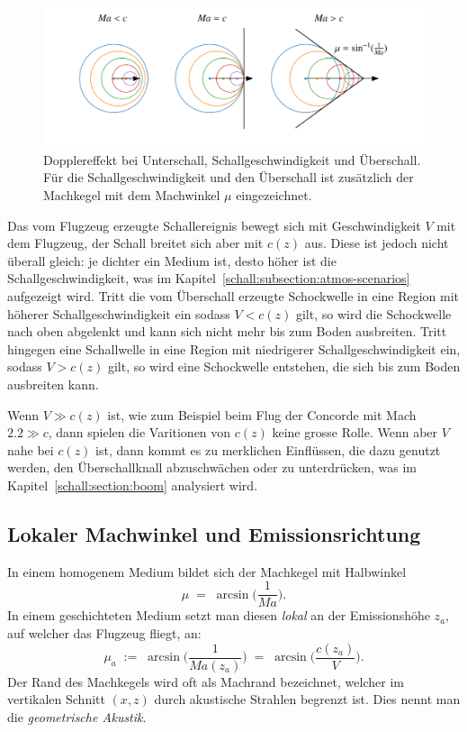 \begin{figure}
    \centering
    \includegraphics[width=\textwidth]{papers/schall/figures/mach_doppler_triptych_offsets.png}
    \caption{Dopplereffekt bei Unterschall, Schallgeschwindigkeit und Überschall.
    Für die Schallgeschwindigkeit und den Überschall ist zusätzlich der
    Machkegel mit dem Machwinkel $\mu$ eingezeichnet.}
    \label{fig:schall:mach-zones}
\end{figure}
Das vom Flugzeug erzeugte Schallereignis bewegt sich mit Geschwindigkeit $V$
mit dem Flugzeug, der Schall breitet sich aber mit $c(z)$ aus.
Diese ist jedoch nicht überall gleich: je dichter ein Medium ist, desto
höher ist die Schallgeschwindigkeit, was im
Kapitel~\ref{schall:subsection:atmos-scenarios} aufgezeigt wird.
Tritt die vom Überschall erzeugte Schockwelle in eine Region mit höherer
Schallgeschwindigkeit ein sodass $V<c(z)$ gilt, so wird die Schockwelle
nach oben abgelenkt und kann sich nicht mehr bis zum Boden ausbreiten.
Tritt hingegen eine Schallwelle in eine Region mit niedrigerer
Schallgeschwindigkeit ein, sodass $V>c(z)$ gilt, so wird eine Schockwelle
entstehen, die sich bis zum Boden ausbreiten kann.

Wenn $V \gg c(z)$ ist, wie zum Beispiel beim Flug der Concorde mit Mach
$2.2 \gg c$, dann spielen die Varitionen von $c(z)$ keine grosse Rolle.
Wenn aber $V$ nahe bei $c(z)$ ist, dann kommt es zu merklichen Einflüssen,
die dazu genutzt werden, den Überschallknall abzuschwächen oder zu
unterdrücken, was im Kapitel~\ref{schall:section:boom} analysiert wird.

\subsection{Lokaler Machwinkel und Emissionsrichtung}
In einem homogenem Medium bildet sich der Machkegel mit Halbwinkel
\begin{equation}
    \mu \;=\; \arcsin\!\Big(\frac{1}{\textit{Ma}}\Big).
\end{equation}
In einem geschichteten Medium setzt man diesen \emph{lokal} an der
Emissionshöhe $z_a$, auf welcher das Flugzeug fliegt, an:
\begin{equation}
    \mu_a \;:=\; \arcsin\!\Big(\frac{1}{\textit{Ma}(z_a)}\Big)
    \;=\; \arcsin\!\Big(\frac{c(z_a)}{V}\Big) .
    \label{eq:local-mach-angle}
\end{equation}
Der Rand des Machkegels wird oft als Machrand bezeichnet, welcher im
vertikalen Schnitt $(x,z)$ durch akustische Strahlen begrenzt ist.
Dies nennt man die \emph{geometrische Akustik}.

